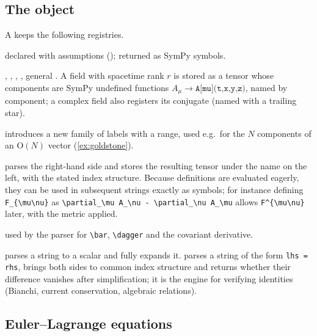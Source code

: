 \subsection{The  object}
\label{sec:model}

A  keeps the following registries.
\begin{description}[nosep,leftmargin=1.2em]
\item[Parameters] declared with assumptions (); returned as SymPy symbols.
\item[Fields] , , , , general . A field with spacetime rank $r$ is stored as a tensor whose components are SymPy undefined functions $A_\mu\to\texttt{A[mu](t,x,y,z)}$, named by component; a complex field also registers its conjugate (named with a trailing star).
\item[Index spaces]  introduces a new family of labels with a range, used e.g.\ for the $N$ components of an $\mathrm{O}(N)$ vector (\cref{ex:goldstone}).
\item[Derived tensors]  parses the right-hand side and stores the resulting tensor under the name on the left, with the stated index structure. Because definitions are evaluated eagerly, they can be used in subsequent strings exactly as symbols; for instance defining \verb|F_{\mu\nu}| as \verb|\partial_\mu A_\nu - \partial_\nu A_\mu| allows \verb|F^{\mu\nu}| later, with the metric applied.
\item[Operators and conjugation map] used by the parser for \verb|\bar|, \verb|\dagger| and the covariant derivative.
\end{description}
 parses a string to a scalar and fully expands it.  parses a string of the form \texttt{lhs = rhs}, brings both sides to common index structure and returns whether their difference vanishes after simplification; it is the engine for verifying identities (Bianchi, current conservation, algebraic relations).

\subsection{Euler--Lagrange equations}
\label{sec:el-impl}

